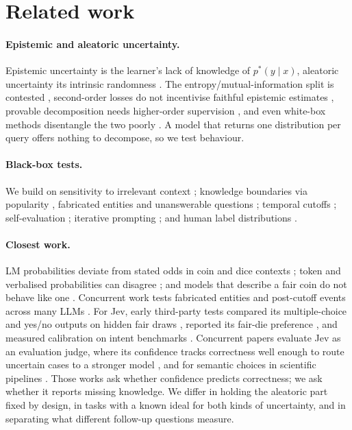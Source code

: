 \documentclass[10pt,twocolumn]{article}
\begin{document}
\section{Related work}
\label{sec:related}

\paragraph{Epistemic and aleatoric uncertainty.}
Epistemic uncertainty is the learner's lack of knowledge of $p^*(y\mid x)$,
aleatoric uncertainty its intrinsic randomness
\citep{hullermeier2021aleatoric}. The entropy/mutual-information split is
contested \citep{wimmer2023quantifying,schweighofer2025information,bickfordsmith2025rethinking},
second-order losses do not incentivise faithful epistemic estimates
\citep{bengs2022pitfalls,jurgens2024epistemic}, provable decomposition needs
higher-order supervision \citep{ahdritz2025provable,johnson2024experts}, and
even white-box methods disentangle the two poorly
\citep{mucsanyi2024benchmarking}. A model that returns one distribution per
query offers nothing to decompose, so we test behaviour.

\paragraph{Black-box tests.}
We build on sensitivity to irrelevant context \citep{shi2023distracted};
knowledge boundaries via popularity \citep{mallen2023popqa}, fabricated
entities and unanswerable questions
\citep{yin2023selfaware,amayuelas2024knowledge,kirichenko2025abstentionbench};
temporal cutoffs \citep{dai2025dailyoracle}; self-evaluation
\citep{kadavath2022language,tian2023just,xiong2024can}; iterative prompting
\citep{abbasiyadkori2024believe}; and human label distributions
\citep{nie2020chaosnli,baan2022stop}.

\paragraph{Closest work.}
LM probabilities deviate from stated odds in coin and dice contexts
\citep{lovering2025numeric}; token and verbalised probabilities can disagree
\citep{expressdoubts2025}; and models that describe a fair coin do not behave
like one \citep{flipping2025}. Concurrent work tests fabricated entities and
post-cutoff events across many LLMs \citep{senol2026dkwtdk2}. For Jev,
early third-party tests compared its multiple-choice and yes/no outputs on
hidden fair draws \citep{hayashi2026dice}, reported its fair-die preference
\citep{typellm2026die}, and measured calibration on intent benchmarks
\citep{assay001}. Concurrent papers evaluate Jev as an evaluation judge,
where its confidence tracks correctness well enough to route uncertain cases
to a stronger model \citep{li2026jevjudge}, and for semantic choices in
scientific pipelines \citep{deng2026jevscience}. Those works ask whether
confidence predicts correctness; we ask whether it reports missing knowledge. We differ in holding the aleatoric part fixed by design, in
tasks with a known ideal for both kinds of uncertainty, and in separating what
different follow-up questions measure.
\end{document}
